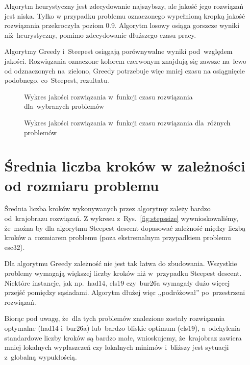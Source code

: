 \documentclass[a4paper,10pt]{article}
\begin{document}
Algorytm heurystyczny jest zdecydowanie najszybszy, ale jakość jego rozwiązań jest niska. 
Tylko w przypadku problemu oznaczonego wypełnioną kropką jakość rozwiązania przekroczyła poziom \num{0.9}.
Algorytm losowy osiąga gorszcze wyniki niż~heurystyczny, pomimo zdecydowanie dłuższego czasu pracy.

Algorytmy Greedy i~Steepest osiągają porównywalne wyniki pod~względem jakości.
Rozwiązania oznaczone kolorem czerwonym znajdują się zawsze na~lewo od odznaczonych na~zielono,
Greedy potrzebuje więc mniej czasu na osiągnięcie podobnego, co~Steepest, rezultatu.

\begin{figure}[!htpb]
\begin{center}

\caption{Wykres jakości rozwiązania w~funkcji czasu rozwiązania dla~wybranych problemów}
\label{fig:qualitytime}
\end{center}
\end{figure}

\begin{figure}
\begin{center}

\caption{Wykres jakości rozwiązania w~funkcji czasu rozwiązania dla~różnych problemów}
\label{fig:qualitytimefull}
\end{center}
\end{figure}

\section{Średnia liczba kroków w zależności od rozmiaru problemu}
Średnia liczba kroków wykonywanych przez algorytmy zależy bardzo od~krajobrazu rozwiązań.
Z wykresu z~Rys.~\ref{fig:stepssize} wywnioskowaliśmy, że~można by dla algorytmu Steepest descent dopasować zależność między liczbą kroków
a~rozmiarem problemu (poza ekstremalnym przypadkiem problemu esc32).

Dla algorytmu Greedy zależność nie jest tak łatwa do zbudowania.
Wszystkie problemy wymagają większej liczby kroków niż w~przypadku Steepest descent. 
Niektóre instancje, jak np.~had14, els19 czy~bur26a wymagały dużo więcej przejść pomiędzy sąsiadami.
Algorytm dłużej więc ,,podróżował'' po~przestrzeni rozwiązań.

Biorąc pod uwagę, że~dla tych problemów znalezione zostały rozwiązania optymalne (had14 i~bur26a)
lub~bardzo bliskie optimum (els19), a~odchylenia standardowe liczby kroków są bardzo małe, wnioskujemy,
że~krajobraz zawiera mniej lokalnych wypłaszczeń czy lokalnych minimów i~bliższy jest sytuacji z~globalną wypukłością.
\end{document}
